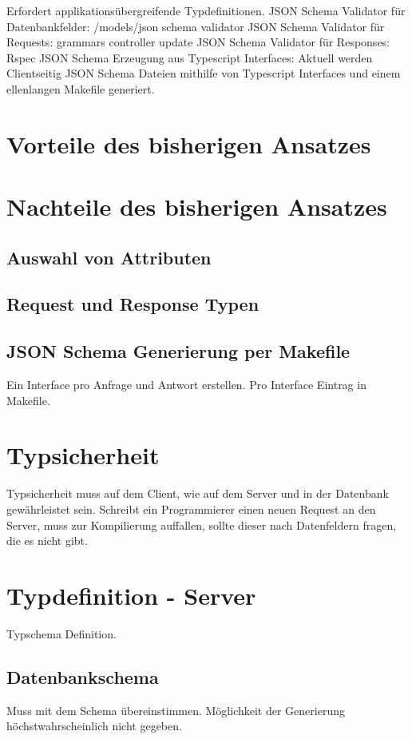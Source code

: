Erfordert applikationsübergreifende Typdefinitionen.
JSON Schema Validator für Datenbankfelder:
/models/json schema validator
JSON Schema Validator für Requests:
grammars controller update
JSON Schema Validator für Responses:
Rspec
JSON Schema Erzeugung aus Typescript Interfaces:
Aktuell werden Clientseitig JSON Schema Dateien mithilfe von Typescript Interfaces und einem ellenlangen Makefile generiert.

\section{Vorteile des bisherigen Ansatzes}
\section{Nachteile des bisherigen Ansatzes}
\subsection{Auswahl von Attributen}
\subsection{Request und Response Typen}
\subsection{JSON Schema Generierung per Makefile}
Ein Interface pro Anfrage und Antwort erstellen. Pro Interface Eintrag in Makefile.

\section{Typsicherheit}
Typsicherheit muss auf dem Client, wie auf dem Server und in der Datenbank gewährleistet sein. Schreibt ein Programmierer einen neuen Request an den Server,
muss zur Kompilierung auffallen, sollte dieser nach Datenfeldern fragen, die es nicht gibt.

\section{Typdefinition - Server}
Typschema Definition.

\subsection{Datenbankschema}
Muss mit dem Schema übereinstimmen. Möglichkeit der Generierung höchstwahrscheinlich nicht gegeben.
